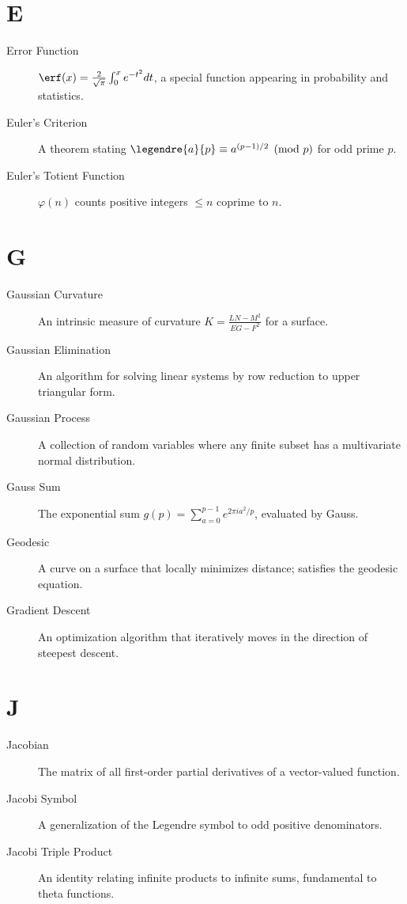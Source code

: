 \section*{E}
\begin{description}
\item[Error Function] $\erf(x) = \frac{2}{\sqrt{\pi}}\int_0^x e^{-t^2} dt$, a special function appearing in probability and statistics.
\item[Euler's Criterion] A theorem stating $\legendre{a}{p} \equiv a^{(p-1)/2} \pmod{p}$ for odd prime $p$.
\item[Euler's Totient Function] $\varphi(n)$ counts positive integers $\leq n$ coprime to $n$.
\end{description}

\section*{G}
\begin{description}
\item[Gaussian Curvature] An intrinsic measure of curvature $K = \frac{LN-M^2}{EG-F^2}$ for a surface.
\item[Gaussian Elimination] An algorithm for solving linear systems by row reduction to upper triangular form.
\item[Gaussian Process] A collection of random variables where any finite subset has a multivariate normal distribution.
\item[Gauss Sum] The exponential sum $g(p) = \sum_{a=0}^{p-1} e^{2\pi i a^2/p}$, evaluated by Gauss.
\item[Geodesic] A curve on a surface that locally minimizes distance; satisfies the geodesic equation.
\item[Gradient Descent] An optimization algorithm that iteratively moves in the direction of steepest descent.
\end{description}

\section*{J}
\begin{description}
\item[Jacobian] The matrix of all first-order partial derivatives of a vector-valued function.
\item[Jacobi Symbol] A generalization of the Legendre symbol to odd positive denominators.
\item[Jacobi Triple Product] An identity relating infinite products to infinite sums, fundamental to theta functions.
\end{description}

